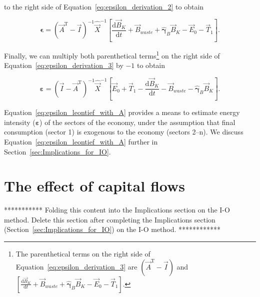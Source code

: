 \noindent{}to the right side of Equation~\ref{eq:epsilon_derivation_2} to obtain

\begin{equation} \label{eq:epsilon_derivation_3}
	\boldsymbol{\epsilon}
	= {(\vec{A}^{\mathrm{T}} - \vec{I})}^{-1} {\hat{\vec{X}}}^{-1} 
		\left[
			\frac{\mathrm{d}\vec{B}_{K}}{\mathrm{d}t}
			+ \vec{B}_{waste}
			+ \hat{\boldsymbol{\gamma}}_{B} \vec{B}_{K}
			- \vec{E}_{0}
			- \vec{T}_{1} 
		\right].
\end{equation}

\noindent{}Finally, we can multiply both parenthetical terms\footnote{The parenthetical
terms on the right side of Equation~\ref{eq:epsilon_derivation_3} 
are $(\vec{A}^{\mathrm{T}} - \vec{I})$ and
$
\left[
	\frac{\mathrm{d}\vec{B}_{K}}{\mathrm{d}t}
	+ \vec{B}_{waste}
	+ \hat{\boldsymbol{\gamma}}_{B} \vec{B}_{K}
	- \vec{E}_{0}
	- \vec{T}_{1} 
\right]
$.} 
on the right side of Equation~\ref{eq:epsilon_derivation_3} by $-1$ to obtain

\begin{equation} \label{eq:epsilon_leontief_with_A}
	\boldsymbol{\varepsilon} 
	= {(\vec{I} - \vec{A}^{\mathrm{T}})}^{-1}\hat{\vec{X}}^{-1}
		\left[\vec{E}_{0} 
				+ \vec{T}_{1} 
				- \frac{\mathrm{d}\vec{B}_{K}}{\mathrm{d}t} 
				- \vec{B}_{waste}
				- \hat{\boldsymbol{\gamma}}_{B}\vec{B}_{K}
		\right].
\end{equation}

Equation~\ref{eq:epsilon_leontief_with_A} provides a means 
to estimate energy intensity ($\boldsymbol{\varepsilon}$)
of the sectors of the economy, under the assumption that
final consumption (sector 1) is exogenous to the economy (sectors 2--n). 
We discuss Equation~\ref{eq:epsilon_leontief_with_A}
further in Section~\ref{sec:Implications_for_IO}.


\section{The effect of capital flows}
\label{sec:intensity_capital_correction}

*********** Folding this content into the
Implications section on the I-O method. 
Delete this section after completing the Implications section
(Section~\ref{sec:Implications_for_IO}) on the I-O method. ************


